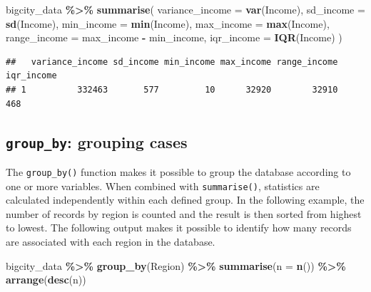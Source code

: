 \documentclass[
  english,
  12pt,
]{book}
\newenvironment{Shaded}{\begin{snugshade}}{\end{snugshade}}
\newcommand{\AttributeTok}[1]{\textcolor[rgb]{0.13,0.29,0.53}{#1}}
\newcommand{\FunctionTok}[1]{\textcolor[rgb]{0.13,0.29,0.53}{\textbf{#1}}}
\newcommand{\NormalTok}[1]{#1}
\newcommand{\SpecialCharTok}[1]{\textcolor[rgb]{0.81,0.36,0.00}{\textbf{#1}}}
\begin{document}
\begin{Shaded}
\begin{Highlighting}[]
\NormalTok{bigcity\_data }\SpecialCharTok{\%\textgreater{}\%}
  \FunctionTok{summarise}\NormalTok{(}
    \AttributeTok{variance\_income =} \FunctionTok{var}\NormalTok{(Income),}
    \AttributeTok{sd\_income =} \FunctionTok{sd}\NormalTok{(Income),}
    \AttributeTok{min\_income =} \FunctionTok{min}\NormalTok{(Income),}
    \AttributeTok{max\_income =} \FunctionTok{max}\NormalTok{(Income),}
    \AttributeTok{range\_income =}\NormalTok{ max\_income }\SpecialCharTok{{-}}\NormalTok{ min\_income,}
    \AttributeTok{iqr\_income =} \FunctionTok{IQR}\NormalTok{(Income)}
\NormalTok{  )}
\end{Highlighting}
\end{Shaded}

\begin{verbatim}
##   variance_income sd_income min_income max_income range_income iqr_income
## 1          332463       577         10      32920        32910        468
\end{verbatim}

\subsection{\texorpdfstring{\texttt{group\_by}: grouping cases}{group\_by: grouping cases}}\label{group-by-agrupacion-de-casos}

The \texttt{group\_by()} function makes it possible to group the database according to one or more variables. When combined with \texttt{summarise()}, statistics are calculated independently within each defined group. In the following example, the number of records by region is counted and the result is then sorted from highest to lowest. The following output makes it possible to identify how many records are associated with each region in the database.

\begin{Shaded}
\begin{Highlighting}[]
\NormalTok{bigcity\_data }\SpecialCharTok{\%\textgreater{}\%}
  \FunctionTok{group\_by}\NormalTok{(Region) }\SpecialCharTok{\%\textgreater{}\%}
  \FunctionTok{summarise}\NormalTok{(}\AttributeTok{n =} \FunctionTok{n}\NormalTok{()) }\SpecialCharTok{\%\textgreater{}\%}
  \FunctionTok{arrange}\NormalTok{(}\FunctionTok{desc}\NormalTok{(n))}
\end{Highlighting}
\end{Shaded}
\end{document}
